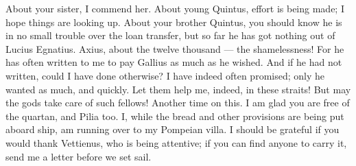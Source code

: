  About your sister, I commend her. About young Quintus, effort is being made; I hope things are looking up. About your brother Quintus, you should know he is in no small trouble over the loan transfer, but so far he has got nothing out of Lucius Egnatius. Axius, about the twelve thousand --- the shamelessness! For he has often written to me to pay Gallius as much as he wished. And if he had not written, could I have done otherwise? I have indeed often promised; only he wanted as much, and quickly. Let them help me, indeed, in these straits! But may the gods take care of such fellows! Another time on this. I am glad you are free of the quartan, and Pilia too. I, while the bread and other provisions are being put aboard ship, am running over to my Pompeian villa. I should be grateful if you would thank Vettienus, who is being attentive; if you can find anyone to carry it, send me a letter before we set sail.
